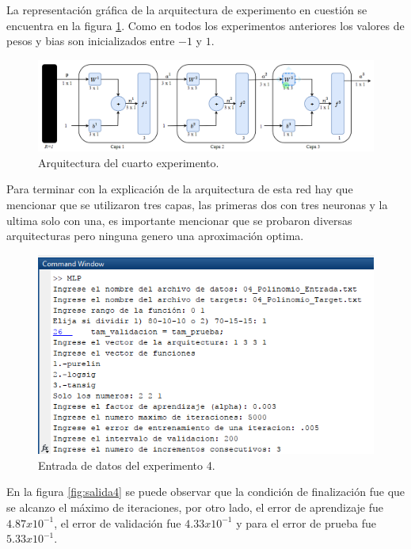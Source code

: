 La representación gráfica de la arquitectura de experimento en cuestión se encuentra en la figura \ref{fig:arqui4}. Como en todos los experimentos anteriores los valores de pesos y bias son inicializados entre $-1$ y $1$.
\begin{figure}[H]
    \begin{center}
        \includegraphics[width=16cm]{img/arqui4.png}
        \caption{Arquitectura del cuarto experimento.}
        \label{fig:arqui4}
    \end{center}
\end{figure}
Para terminar con la explicación de la arquitectura de esta red hay que mencionar que se utilizaron tres capas, las primeras dos con tres neuronas y la ultima solo con una, es importante mencionar que se probaron diversas arquitecturas pero ninguna genero una aproximación optima.
\begin{figure}[H]
    \begin{center}
        \includegraphics[width=14cm]{4/entrada.png}
        \caption{Entrada de datos del experimento 4.}
        \label{fig:entrada4}
    \end{center}
\end{figure}
En la figura \ref{fig:salida4} se puede observar que la condición de finalización fue que se alcanzo el máximo de iteraciones, por otro lado, el error de aprendizaje fue $4.87 x 10^{-1}$, el error de validación fue $4.33 x 10^{-1}$ y para el error de prueba fue $5.33 x 10^{-1}$.
